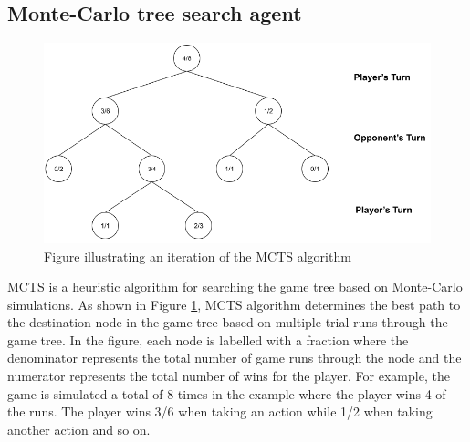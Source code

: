 \subsection{Monte-Carlo tree search agent}

\begin{figure}[!ht]
    \centering
    \includegraphics[width = \linewidth]{../img/MCTS1.png}
    \caption{Figure illustrating an iteration of the MCTS algorithm}
    \label{fig:MCTS1}
\end{figure}

\ac{MCTS} is a heuristic algorithm for searching the game tree based on Monte-Carlo simulations. As shown in Figure \ref{fig:MCTS1}, \gls{MCTS} algorithm determines the best path to the destination node in the game tree based on multiple trial runs through the game tree. In the figure, each node is labelled with a fraction where the denominator represents the total number of game runs through the node and the numerator represents the total number of wins for the player. For example, the game is simulated a total of 8 times in the example where the player wins 4 of the runs. The player wins 3/6 when taking an action while 1/2 when taking another action and so on.

